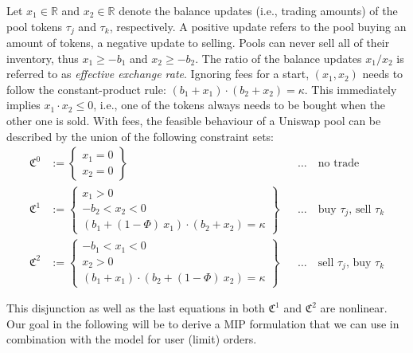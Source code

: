 \documentclass[11pt,parskip=full]{scrartcl}%
\newcommand*{\ie}{i.e., }
\newcommand*{\token}{\tau}                  %
\begin{document}
Let $x_1 \in \mathbb{R}$ and $x_2 \in \mathbb{R}$ denote the balance updates (\ie trading amounts) of the pool tokens $\token_j$ and $\token_k$, respectively.
A positive update refers to the pool buying an amount of tokens, a negative update to selling.
Pools can never sell all of their inventory, thus $x_1 \ge -b_1$ and $x_2 \ge -b_2$.
The ratio of the balance updates $x_1 / x_2$ is referred to as \emph{effective exchange rate}.
Ignoring fees for a start, $(x_1, x_2)$ needs to follow the constant-product rule:
$(b_1 + x_1) \cdot (b_2 + x_2) = \kappa$.
This immediately implies $x_1 \cdot x_2 \le 0$, \ie one of the tokens always needs to be bought when the other one is sold.
With fees, the feasible behaviour of a Uniswap pool can be described by the union of the following constraint sets:
\begin{subequations}
  \begin{align}
    \mathfrak{C}^0 &:= \left\{
    \begin{array}{c}
      x_1 = 0 \\
      x_2 = 0
    \end{array}
    \right\}
    && \ldots \quad \text{no trade}
    \label{eq:uniswap_model_generic_0}
    \\[2mm]
    \mathfrak{C}^1 &:= \left\{
    \begin{array}{c}
      x_1 > 0 \\[1mm]
      -b_2 < x_2 < 0 \\[1mm]
      (b_1 + (1-\Phi)\> x_1) \cdot (b_2 + x_2) = \kappa
    \end{array}
    \right\}
    && \ldots \quad \text{buy $\token_j$, sell $\token_k$}
    \label{eq:uniswap_model_generic_1}
    \\[2mm]
    \mathfrak{C}^2 &:= \left\{
    \begin{array}{c}
      -b_1 < x_1 < 0 \\[1mm]
      x_2 > 0 \\[1mm]
      (b_1 + x_1) \cdot (b_2 + (1-\Phi)\> x_2) = \kappa
    \end{array}
    \right\}
    && \ldots \quad \text{sell $\token_j$, buy $\token_k$}
    \label{eq:uniswap_model_generic_2}
  \end{align}
  \label{eq:uniswap_model_generic}
\end{subequations}

This disjunction as well as the last equations in both $\mathfrak{C}^1$ and $\mathfrak{C}^2$ are nonlinear.
Our goal in the following will be to derive a MIP formulation that we can use in combination with the model for user (limit) orders.
\end{document}
